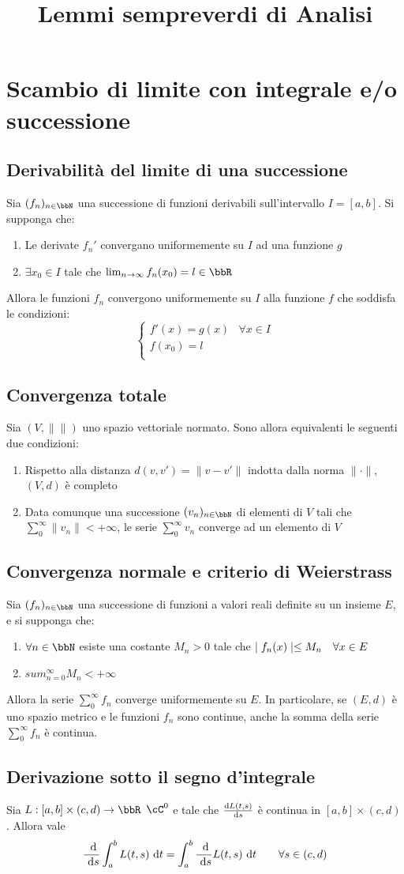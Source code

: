 \documentclass[a4paper,NoNotes,GeneralMath]{stdmdoc}
\renewcommand{\norma}[1]{\| {#1} \|}
\begin{document}
	\title{Lemmi sempreverdi di Analisi}
	
	\section*{Scambio di limite con integrale e/o successione}
	\subsection*{Derivabilità del limite di una successione}
	Sia $(f_n)_{n \in \bbN}$ una successione di funzioni derivabili sull'intervallo $I = [a, b]$. Si supponga che:
	\begin{enumerate}
		\item Le derivate $f_n'$ convergano uniformemente su $I$ ad una funzione $g$
		\item $\exists x_0 \in I$ tale che $\lim_{n \rar \infty} f_n(x_0) = l \in \bbR$
	\end{enumerate}
	Allora le funzioni $f_n$ convergono uniformemente su $I$ alla funzione $f$ che soddisfa le condizioni:
	$$ \left\{ \begin{array}{cc} f'(x) = g(x) & \forall x \in I \\ f(x_0) = l & \\ \end{array} \right. $$
	
	\subsection*{Convergenza totale}
	Sia $(V, \norma{})$ uno spazio vettoriale normato. Sono allora equivalenti le seguenti due condizioni:
	\begin{enumerate}
		\item Rispetto alla distanza $d(v, v') = \norma{v - v'}$ indotta dalla norma $\norma{\cdot}$, $(V, d)$ è completo
		\item Data comunque una successione $(v_n)_{n \in \bbN}$ di elementi di $V$ tali che $\sum_0^\infty \norma{v_n} < +\infty$, le serie $\sum_0^\infty v_n$ converge ad un elemento di $V$
	\end{enumerate}
	
	\subsection*{Convergenza normale e criterio di Weierstrass}
	Sia $(f_n)_{n \in \bbN}$ una successione di funzioni a valori reali definite su un insieme $E$, e si supponga che:
	\begin{enumerate}
		\item $\forall n \in \bbN$ esiste una costante $M_n > 0$ tale che $\mid f_n(x) \mid \le M_n \quad \forall x \in E$
		\item $sum_{n = 0}^\infty M_n < +\infty$
	\end{enumerate}
	Allora la serie $\sum_0^\infty f_n$ converge uniformemente su $E$. In particolare, se $(E, d)$ è uno spazio metrico e le funzioni $f_n$ sono continue, anche la somma della serie $\sum_0^\infty f_n$ è continua.
	
	\subsection*{Derivazione sotto il segno d'integrale}
	Sia $L : [a, b] \times (c, d) \rar \bbR$ $\cC^0$ e tale che $\de{L(t, s)}{s}$ è continua in $[a, b] \times (c, d)$. Allora vale
	$$ \dde{s} \int_a^b L(t, s) \de{t} = \int_a^b \dde{s} L(t,s) \de{t} \qquad \forall s \in (c, d) $$
\end{document}
